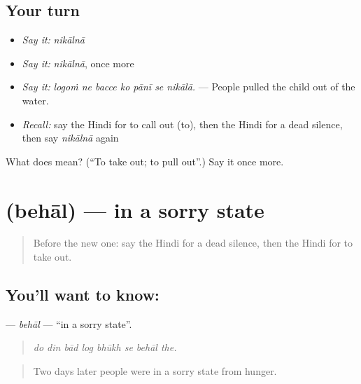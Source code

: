 \subsection*{Your turn}
\begin{itemize}
\raggedright
  \item \emph{Say it:} \emph{nikālnā}
  \item \emph{Say it:} \emph{nikālnā}, once more
  \item \emph{Say it:} \emph{logoṁ ne bacce ko pānī se nikālā.} — People pulled the child out of the water.
  \item \emph{Recall:} say the Hindi for to call out (to), then the Hindi for a dead silence, then say \emph{nikālnā} again
\end{itemize}

\begin{tcolorbox}[breakable,colback=teal!4,colframe=teal!35!black,title={Before you move on}]
What does  mean? (\textquotedblleft{}To take out; to pull out\textquotedblright{}.) Say it once more.
\end{tcolorbox}
\section[\texorpdfstring{\hi{बेहाल} (behāl)}{बेहाल (behāl)}]{ (behāl) — in a sorry state}

\label{lesson:HI-C307-behal}



\begin{quote}
Before the new one: say the Hindi for a dead silence, then the Hindi for to take out.
\end{quote}

\subsection*{You'll want to know: }
\textbf{} — \emph{behāl} — \textquotedblleft{}in a sorry state\textquotedblright{}.

\begin{quote}
       
\end{quote}

\begin{quote}
\emph{do din bād log bhūkh se behāl the.}
\end{quote}

\begin{quote}
Two days later people were in a sorry state from hunger.
\end{quote}

